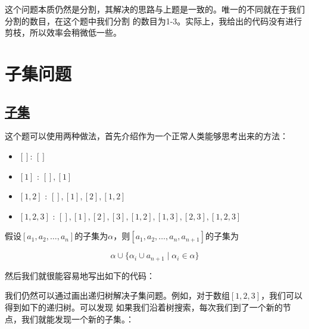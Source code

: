 \documentclass[../../main.tex]{subfiles}
\begin{document}
这个问题本质仍然是分割，其解决的思路与上题是一致的。唯一的不同就在于我们分割的数目，在这个题中我们分割
的数目为1-3。实际上，我给出的代码没有进行剪枝，所以效率会稍微低一些。



\section{子集问题}

\subsection{\href{https://leetcode-cn.com/problems/subsets/}{子集}}

这个题可以使用两种做法，首先介绍作为一个正常人类能够思考出来的方法：

\begin{itemize}
  \item $[]$: $[]$
  \item $[1]$ : $[], [1]$
  \item $[1, 2]$ : $[], [1], [2], [1, 2]$
  \item $[1, 2, 3]$ : $[], [1], [2], [3], [1, 2], [1, 3], [2, 3], [1, 2, 3]$
\end{itemize}

假设$[a_{1}, a_{2}, \dots, a_{n}]$的子集为$\alpha$，则$[a_{1}, a_{2}, \dots, a_{n}, a_{n+1}]$的子集为

$$
\alpha \cup \{ \alpha_{i} \cup a_{n+1} \mid \alpha_{i} \in \alpha \}
$$

然后我们就很能容易地写出如下的代码：



我们仍然可以通过画出递归树解决子集问题。例如，对于数组$[1, 2, 3]$，我们可以得到如下的递归树。可以发现
如果我们沿着树搜索，每次我们到了一个新的节点，我们就能发现一个新的子集。：

\end{document}
